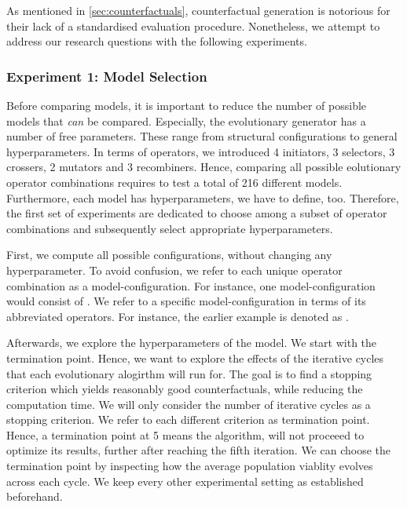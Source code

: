 \documentclass[./../../paper.tex]{subfiles}
\begin{document}
As mentioned in \autoref{sec:counterfactuals}, counterfactual generation is notorious for their lack of a standardised evaluation procedure. Nonetheless, we attempt to address our research questions with the following experiments.

\subsubsection{Experiment 1: Model Selection}
Before comparing models, it is important to reduce the number of possible models that \emph{can} be compared. Especially, the evolutionary generator has a number of free parameters. These range from structural configurations to general hyperparameters. In terms of operators, we introduced 4 initiators, 3 selectors, 3 crossers, 2 mutators and 3 recombiners. Hence, comparing all possible eolutionary operator combinations requires to test a total of 216 different models. Furthermore, each model has hyperparameters, we have to define, too. Therefore, the first set of experiments are dedicated to choose among a subset of operator combinations and subsequently select appropriate hyperparameters.  

First, we compute all possible configurations, without changing any hyperparameter. To avoid confusion, we refer to each unique operator combination as a model-configuration. For instance, one model-configuration would consist of . We refer to a specific model-configuration in terms of its abbreviated operators. For instance, the earlier example is denoted as .

Afterwards, we explore the hyperparameters of the model. We start with the termination point. Hence, we want to explore the effects of the iterative cycles that each evolutionary alogirthm will run for. The goal is to find a stopping criterion which yields reasonably good counterfactuals, while reducing the computation time. We will only consider the number of iterative cycles as a stopping criterion. We refer to each different criterion as termination point. Hence, a termination point at 5 means the algorithm, will not proceeed to optimize its results, further after reaching the fifth iteration. We can choose the termination point by inspecting how the average population viablity evolves across each cycle. We keep every other experimental setting as established beforehand.
\end{document}
